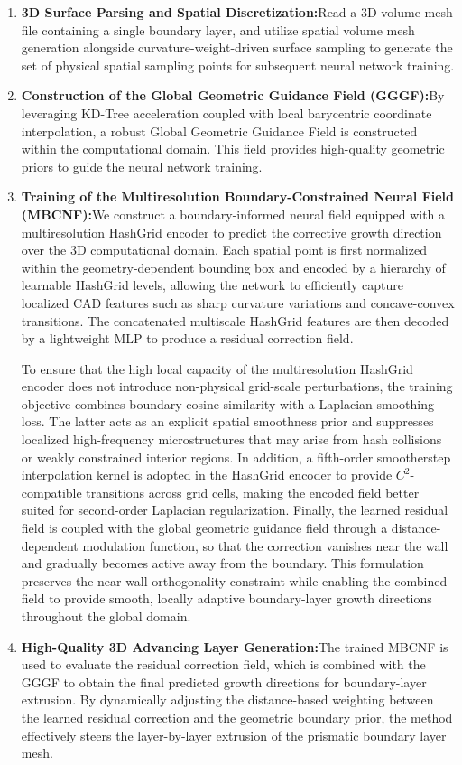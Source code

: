 \documentclass[%
 aip,
 amsmath,amssymb,
 reprint,%
nobibnotes,
]{revtex4-1}
\begin{document}
\begin{enumerate}
    \item \textbf{3D Surface Parsing and Spatial Discretization:}Read a 3D volume mesh file containing a single boundary layer, and utilize spatial volume mesh generation alongside curvature-weight-driven surface sampling to generate the set of physical spatial sampling points for subsequent neural network training.
    \item \textbf{Construction of the Global Geometric Guidance Field (GGGF):}By leveraging KD-Tree acceleration coupled with local barycentric coordinate interpolation, a robust Global Geometric Guidance Field is constructed within the computational domain. This field provides high-quality geometric priors to guide the neural network training.
    \item \textbf{Training of the Multiresolution Boundary-Constrained Neural Field (MBCNF):}We construct a boundary-informed neural field equipped with a multiresolution HashGrid encoder to predict the corrective growth direction over the 3D computational domain. Each spatial point is first normalized within the geometry-dependent bounding box and encoded by a hierarchy of learnable HashGrid levels, allowing the network to efficiently capture localized CAD features such as sharp curvature variations and concave-convex transitions. The concatenated multiscale HashGrid features are then decoded by a lightweight MLP to produce a residual correction field.

    To ensure that the high local capacity of the multiresolution HashGrid encoder does not introduce non-physical grid-scale perturbations, the training objective combines boundary cosine similarity with a Laplacian smoothing loss. 
    The latter acts as an explicit spatial smoothness prior and suppresses localized high-frequency microstructures that may arise from hash collisions or weakly constrained interior regions. 
    In addition, a fifth-order smootherstep interpolation kernel is adopted in the HashGrid encoder to provide $C^2$-compatible transitions across grid cells, making the encoded field better suited for second-order Laplacian regularization. 
    Finally, the learned residual field is coupled with the global geometric guidance field through a distance-dependent modulation function, so that the correction vanishes near the wall and gradually becomes active away from the boundary. 
    This formulation preserves the near-wall orthogonality constraint while enabling the combined field to provide smooth, locally adaptive boundary-layer growth directions throughout the global domain.
    \item \textbf{High-Quality 3D Advancing Layer Generation:}The trained MBCNF is used to evaluate the residual correction field, which is combined with the GGGF to obtain the final predicted growth directions for boundary-layer extrusion. By dynamically adjusting the distance-based weighting between the learned residual correction and the geometric boundary prior, the method effectively steers the layer-by-layer extrusion of the prismatic boundary layer mesh.
\end{enumerate}
\end{document}
